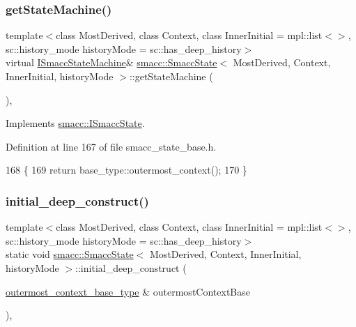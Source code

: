 \subsubsection{\texorpdfstring{get\+State\+Machine()}{getStateMachine()}}
{\footnotesize\ttfamily template$<$class Most\+Derived, class Context, class Inner\+Initial = mpl\+::list$<$$>$, sc\+::history\+\_\+mode history\+Mode = sc\+::has\+\_\+deep\+\_\+history$>$ \\
virtual \hyperlink{classsmacc_1_1ISmaccStateMachine}{I\+Smacc\+State\+Machine}\& \hyperlink{classsmacc_1_1SmaccState}{smacc\+::\+Smacc\+State}$<$ Most\+Derived, Context, Inner\+Initial, history\+Mode $>$\+::get\+State\+Machine (\begin{DoxyParamCaption}{ }\end{DoxyParamCaption})\hspace{0.3cm}{\ttfamily [inline]}, {\ttfamily [virtual]}}



Implements \hyperlink{classsmacc_1_1ISmaccState_a562bb3f9a3ac16b8be71e4794c9e7523}{smacc\+::\+I\+Smacc\+State}.



Definition at line 167 of file smacc\+\_\+state\+\_\+base.\+h.


\begin{DoxyCode}
168     \{
169       \textcolor{keywordflow}{return} base\_type::outermost\_context();
170     \}
\end{DoxyCode}
\mbox{\label{classsmacc_1_1SmaccState_af4b4635d16a32bdd3956e5d40ddbd01d}} 
\subsubsection{\texorpdfstring{initial\+\_\+deep\+\_\+construct()}{initial\_deep\_construct()}}
{\footnotesize\ttfamily template$<$class Most\+Derived, class Context, class Inner\+Initial = mpl\+::list$<$$>$, sc\+::history\+\_\+mode history\+Mode = sc\+::has\+\_\+deep\+\_\+history$>$ \\
static void \hyperlink{classsmacc_1_1SmaccState}{smacc\+::\+Smacc\+State}$<$ Most\+Derived, Context, Inner\+Initial, history\+Mode $>$\+::initial\+\_\+deep\+\_\+construct (\begin{DoxyParamCaption}\item[{\hyperlink{classsmacc_1_1SmaccState_aaf76bbe2aa9dd73e3284605f84ab4b16}{outermost\+\_\+context\+\_\+base\+\_\+type} \&}]{outermost\+Context\+Base }\end{DoxyParamCaption})\hspace{0.3cm}{\ttfamily [inline]}, {\ttfamily [static]}}



